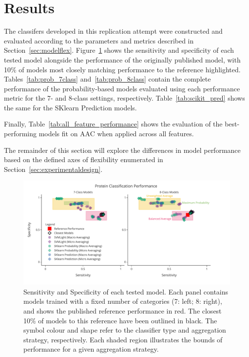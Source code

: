 \section {Results}
\label{sec:results}

The classifers developed in this replication attempt were constructed and evaluated according to the parameters
and metrics described in Section~\ref{sec:modelflex}. Figure~\ref{fig:7_class_model} shows the sensitivity
and specificity of each tested model alongside the performance of the originally published model, with 10\% of models
most closely matching performance to the reference highlighted.
Tables~\ref{tab:prob_7class} and~\ref{tab:prob_8class} contain the complete performance of the probability-based models
evaluated using each performance metric for the 7- and 8-class settings, respectively. Table~\ref{tab:scikit_pred}
shows the same for the SKlearn Prediction models.

Finally, Table~\ref{tab:all_feature_performance} shows the evaluation
of the best-performing models fit on AAC when applied across all features.


The remainder of this section will explore the differences in model performance based on the defined axes of
flexibility enumerated in Section~\ref{sec:experimentaldesign}.

\begin{figure}
  \centering
  \includegraphics[width=\textwidth]{figures/fig1_model_performance.pdf}
  \caption{Sensitivity and Specificity of each tested model. Each panel contains models trained with a fixed number of
categories (7: left; 8: right), and shows the published reference performance in red. The closest 10\% of models to
this reference have been outlined in black. The symbol colour and shape refer to the classifier type and aggregation
strategy, respectively. Each shaded region illustrates the bounds of performance for a given aggregation strategy.}
   \label{fig:7_class_model}
\end{figure}

